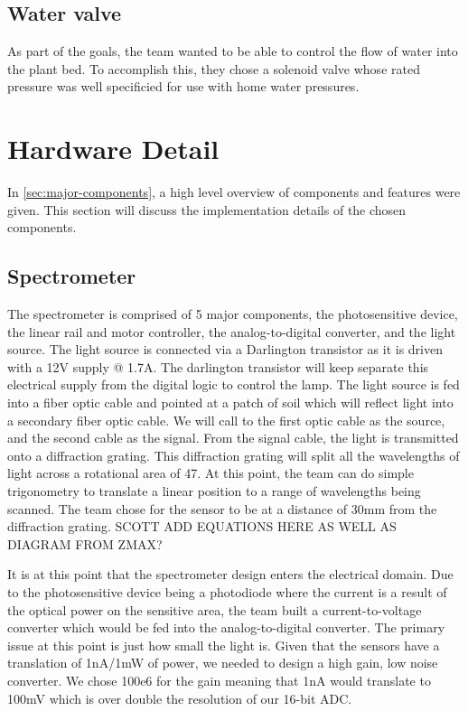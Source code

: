 \documentclass[journal]{IEEEtran}
\begin{document}
\subsection{Water valve}
As part of the goals, the team wanted to be able to control the flow of water
into the plant bed. To accomplish this, they chose a solenoid valve whose rated pressure was well specificied for use with home water pressures.
\section{Hardware Detail}
In \autoref{sec:major-components}, a high level overview of components and features were given. This
section will discuss the implementation details of the chosen components.
\subsection{Spectrometer}
The spectrometer is comprised of 5 major components, the photosensitive device, the linear rail and motor controller, the analog-to-digital converter, and the light source. The light source is connected via a Darlington transistor as it is driven with a 12V supply @ 1.7A. The darlington transistor will keep separate this electrical supply from the digital logic to control the lamp. The light source is fed into a fiber optic cable and pointed at a patch of soil which will reflect light into a secondary fiber optic cable. We will call to the first optic cable as the source, and the second cable as the signal. From the signal cable, the light is transmitted onto a diffraction grating. This diffraction grating will split all the wavelengths of light across a rotational area of 47\textdegree. At this point, the team can do simple trigonometry to translate a linear position to a range of wavelengths being scanned. The team chose for the sensor to be at a distance of 30mm from the diffraction grating. SCOTT ADD EQUATIONS HERE AS WELL AS DIAGRAM FROM ZMAX?

It is at this point that the spectrometer design enters the electrical domain. Due to the photosensitive device being a photodiode where the current is a result of the optical power on the sensitive area, the team built a current-to-voltage converter which would be fed into the analog-to-digital converter. The primary issue at this point is just how small the light is. Given that the sensors have a translation of 1nA/1mW of power, we needed to design a high gain, low noise converter. We chose 100e6 for the gain meaning that 1nA would translate to 100mV which is over double the resolution of our 16-bit ADC.
\end{document}
